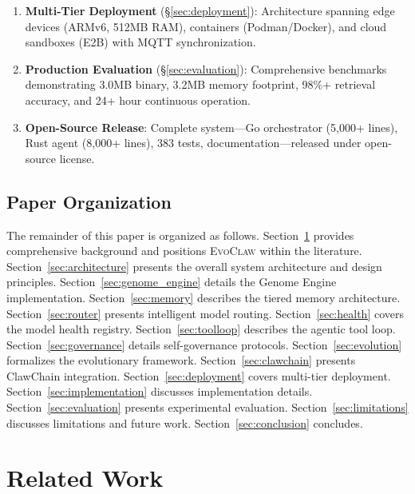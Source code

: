 \documentclass{article}
\newcommand{\evoclaw}{\textsc{EvoClaw}}
\begin{document}
\begin{enumerate}[leftmargin=*]
    \item \textbf{Multi-Tier Deployment} (\S\ref{sec:deployment}): Architecture spanning edge devices (ARMv6, 512MB RAM), containers (Podman/Docker), and cloud sandboxes (E2B) with MQTT synchronization.
    
    \item \textbf{Production Evaluation} (\S\ref{sec:evaluation}): Comprehensive benchmarks demonstrating 3.0MB binary, 3.2MB memory footprint, 98\%+ retrieval accuracy, and 24+ hour continuous operation.
    
    \item \textbf{Open-Source Release}: Complete system—Go orchestrator (5,000+ lines), Rust agent (8,000+ lines), 383 tests, documentation—released under open-source license.
\end{enumerate}

\subsection{Paper Organization}

The remainder of this paper is organized as follows. Section~\ref{sec:related} provides comprehensive background and positions \evoclaw{} within the literature. Section~\ref{sec:architecture} presents the overall system architecture and design principles. Section~\ref{sec:genome_engine} details the Genome Engine implementation. Section~\ref{sec:memory} describes the tiered memory architecture. Section~\ref{sec:router} presents intelligent model routing. Section~\ref{sec:health} covers the model health registry. Section~\ref{sec:toolloop} describes the agentic tool loop. Section~\ref{sec:governance} details self-governance protocols. Section~\ref{sec:evolution} formalizes the evolutionary framework. Section~\ref{sec:clawchain} presents ClawChain integration. Section~\ref{sec:deployment} covers multi-tier deployment. Section~\ref{sec:implementation} discusses implementation details. Section~\ref{sec:evaluation} presents experimental evaluation. Section~\ref{sec:limitations} discusses limitations and future work. Section~\ref{sec:conclusion} concludes.



\section{Related Work}
\label{sec:related}
\end{document}
